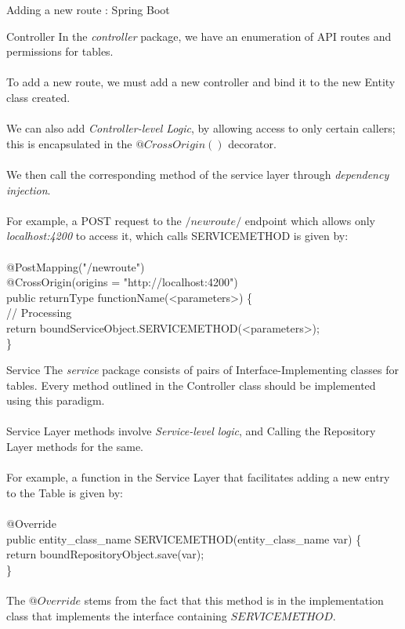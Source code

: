 \documentclass[
10pt, %
a4paper, %
oneside, %
headinclude,footinclude, %
BCOR5mm, %
]{scrartcl}
\begin{document}
\begin{section}{Adding a new route : Spring Boot}
\begin{subsection}{Controller}
In the \textit{controller} package, we have an enumeration of API routes and permissions for tables. \\ \\ To add a new route, we must add a new controller and bind it to the new Entity class created. \\ \\We can also add \textit{Controller-level Logic}, by allowing access to only certain callers; this is encapsulated in the $@CrossOrigin()$ decorator. \\ \\ 
We then call the corresponding method of the service layer through \textit{dependency injection}. \\ \\
For example, a POST request to the $/newroute/$ endpoint which allows only \textit{localhost:4200} to access it, which calls SERVICEMETHOD is given by: \\ \\
@PostMapping("/newroute") \\
@CrossOrigin(origins = "http://localhost:4200") \\
public returnType functionName(<parameters>) \{ \\ 
    \hspace{10cm} // Processing \\
    \hspace{1cm} return boundServiceObject.SERVICEMETHOD(<parameters>); \\ 
\}
\end{subsection}

\begin{subsection}{Service}
The \textit{service} package consists of pairs of Interface-Implementing classes for tables. Every method outlined in the Controller class should be implemented using this paradigm. \\ \\
Service Layer methods involve \textit{Service-level logic}, and Calling the Repository Layer methods for the same.\\ \\
For example, a function in the Service Layer that facilitates adding a new entry to the Table is given by: \\ \\
@Override \\
public entity\_class\_name SERVICEMETHOD(entity\_class\_name var) \{ \\
        return boundRepositoryObject.save(var); \\
\} \\ \\
The $@Override$ stems from the fact that this method is in the implementation class that implements the interface containing $SERVICEMETHOD$.
\end{subsection}


\end{section}
\end{document}

